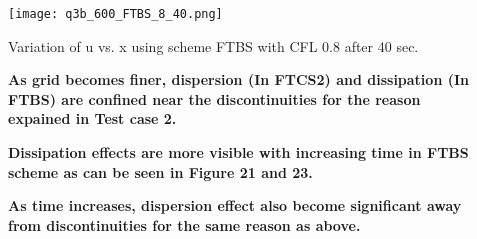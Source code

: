 \documentclass{article}
\begin{document}
\begin{figure}[H] \label{figure}
\texttt{[image: q3b\_600\_FTBS\_8\_40.png]}
\caption{Variation of u vs. x using scheme FTBS with CFL 0.8 after 40 sec.}
\label{figure:}
\end{figure}

\begin{description}
\item[]\textbf{ As grid becomes finer, dispersion (In FTCS2) and dissipation (In FTBS) are confined near the discontinuities for the reason expained in Test case 2.}
\item[]\textbf{ Dissipation effects are more visible with increasing time in FTBS scheme as can be seen in Figure 21 and 23.}
\item[]\textbf{ As time increases, dispersion effect also become significant away from discontinuities for the same reason as above.}

\end{description}
\end{document}
